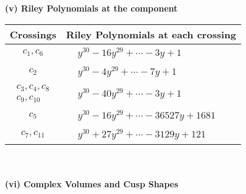 \documentclass[1p]{elsarticle_modified}
\theoremstyle{definition}
\begin{document}
\newpage\renewcommand{\arraystretch}{1}
\flushleft \textbf{(v) Riley Polynomials at the component}\newline \\
\begin{tabular}{m{50pt}|m{274pt}}
Crossings & \hspace{64pt}Riley Polynomials at each crossing \\
\hline $$\begin{aligned}c_{1},c_{6}\end{aligned}$$&$\begin{aligned}
&y^{30}-16 y^{29}+\cdots-3 y+1
\end{aligned}$\\
\hline $$\begin{aligned}c_{2}\end{aligned}$$&$\begin{aligned}
&y^{30}-4 y^{29}+\cdots-7 y+1
\end{aligned}$\\
\hline $$\begin{aligned}c_{3},c_{4},c_{8}\\c_{9},c_{10}\end{aligned}$$&$\begin{aligned}
&y^{30}-40 y^{29}+\cdots-3 y+1
\end{aligned}$\\
\hline $$\begin{aligned}c_{5}\end{aligned}$$&$\begin{aligned}
&y^{30}-16 y^{29}+\cdots-36527 y+1681
\end{aligned}$\\
\hline $$\begin{aligned}c_{7},c_{11}\end{aligned}$$&$\begin{aligned}
&y^{30}+27 y^{29}+\cdots-3129 y+121
\end{aligned}$\\
\hline
\end{tabular}\\~\\
\newpage\flushleft \textbf{(vi) Complex Volumes and Cusp Shapes}
\end{document}
